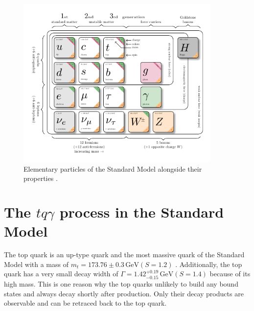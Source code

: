 \begin{figure}
    \centering
    \includegraphics[width=0.9\textwidth]{Plots/model-physics.pdf}
    \caption{Elementary particles of the Standard Model alongside their properties \cite{sm_table}.}
    \label{fig:standard_model}
\end{figure}

\section{The \texorpdfstring{$tq\gamma$}{tqGamma} process in the Standard Model}


The top quark is an up-type quark and the most massive quark of the Standard Model with a mass of $m_t = 173.76 \pm 0.3 \,\si{\giga\electronvolt} (S =1.2)$ \cite{pdg}. Additionally, the top quark has a very small decay width of $\Gamma = 1.42^{+0.19}_{-0.15} \,\si{\giga\electronvolt} (S=1.4)$ \cite{pdg} because of its high mass.
This is one reason why the top quarks unlikely to build any bound states and always decay shortly after production. Only their decay products are observable and can be retraced back to the top quark. 

